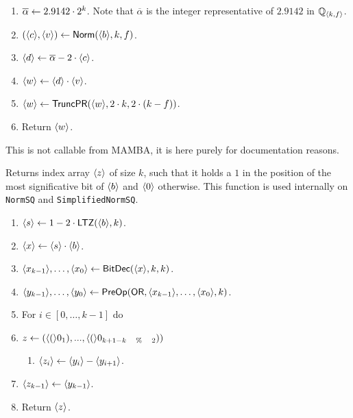 \begin{enumerate}
\item $\overline{\alpha} \leftarrow 2.9142 \cdot 2^k$.
	Note that $\overline{\alpha}$ is the integer representative of $2.9142$ in ${\mathbb{Q}}_{\langle k, f \rangle}$.
\item $(\langle c \rangle,\langle v \rangle) \leftarrow \mathsf{Norm}(\langle b \rangle,k,f)$.
\item $\langle d \rangle \leftarrow \overline{\alpha} - 2 \cdot \langle c \rangle$.
\item $\langle w \rangle \leftarrow \langle d \rangle \cdot \langle v \rangle$.
\item $\langle w \rangle \leftarrow \mathsf{TruncPR}(\langle w \rangle,2 \cdot k,2 \cdot (k-f))$.
\item Return $\langle w \rangle$.
\end{enumerate}
This is not callable from MAMBA, it is here purely for documentation reasons.

Returns index array $\langle z \rangle$ of size $k$, such that it holds a $1$ in the position of the most significative bit of $\langle b \rangle$ and $\langle 0 \rangle$ otherwise. This function is used internally on \verb|NormSQ| and \verb|SimplifiedNormSQ|.
\begin{enumerate}

\item $\langle s \rangle \leftarrow 1-2 \cdot \mathsf{LTZ}(\langle b \rangle,k)$.
\item $\langle x \rangle \leftarrow \langle s \rangle \cdot \langle b \rangle$.
\item $\langle x_{k-1} \rangle,\ldots,\langle x_0 \rangle \leftarrow \mathsf{BitDec}(\langle x \rangle,k,k)$.
\item $\langle y_{k-1} \rangle,\ldots,\langle y_0 \rangle \leftarrow \mathsf{PreOp}(\mathsf{OR},\langle x_{k-1} \rangle,\ldots,\langle x_0 \rangle,k)$.
\item For $i \in [0,\ldots,k-1]$ do 
\item $z \leftarrow (\langle ( \rangle0_{1}),...,\langle ( \rangle0_{k + 1 - k \quad \% \quad 2}))$
\begin{enumerate}
  \item $\langle z_i \rangle \leftarrow \langle y_i \rangle-\langle y_{i+1} \rangle$.
\end{enumerate}
\item $\langle z_{k-1} \rangle \leftarrow \langle y_{k-1} \rangle$.
\item Return $\langle z \rangle$.
\end{enumerate}


